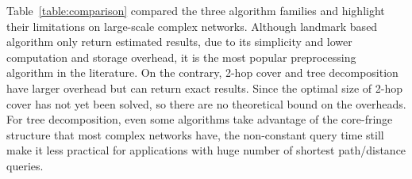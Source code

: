 Table~\ref{table:comparison} compared the three algorithm families and highlight their limitations on large-scale complex networks. Although landmark based algorithm only return estimated results, due to its simplicity and lower computation and storage overhead, it is the most popular preprocessing algorithm in the literature. On the contrary, 2-hop cover and tree decomposition have larger overhead but can return exact results. Since the optimal size of 2-hop cover has not yet been solved, so there are no theoretical bound on the overheads. For tree decomposition, even some algorithms take advantage of the core-fringe structure that most complex networks have, the non-constant query time still make it less practical for applications with huge number of shortest path/distance queries.
